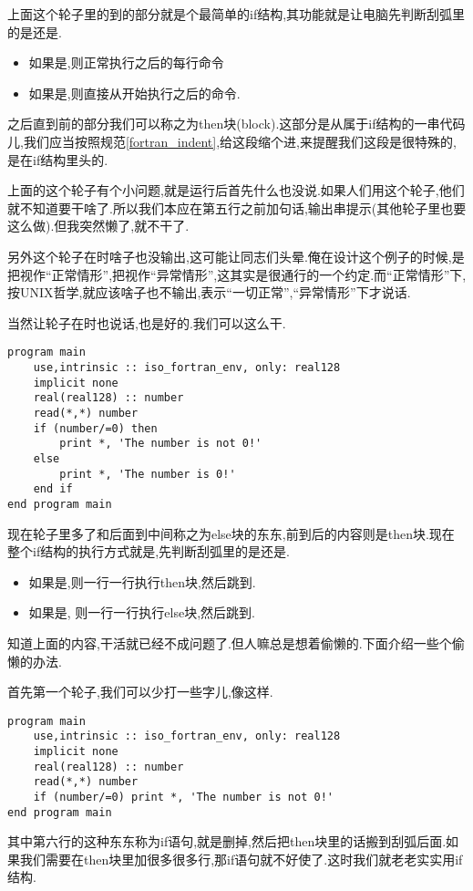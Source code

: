 上面这个轮子里的到的部分就是个最简单的if结构,其功能就是让电脑先判断刮弧里的是还是.
\begin{itemize}
    \item 如果是,则正常执行之后的每行命令
    \item 如果是,则直接从开始执行之后的命令.
\end{itemize}

之后直到前的部分我们可以称之为then块(block).这部分是从属于if结构的一串代码儿,我们应当按照规范\ref{fortran_indent},给这段缩个进,来提醒我们这段是很特殊的,是在if结构里头的.

上面的这个轮子有个小问题,就是运行后首先什么也没说.如果人们用这个轮子,他们就不知道要干啥了.所以我们本应在第五行之前加句话,输出串提示(其他轮子里也要这么做).但我突然懒了,就不干了.

另外这个轮子在时啥子也没输出,这可能让同志们头晕.俺在设计这个例子的时候,是把视作``正常情形'',把视作``异常情形'',这其实是很通行的一个约定.而``正常情形''下,按UNIX哲学,就应该啥子也不输出,表示``一切正常'',``异常情形''下才说话.

当然让轮子在时也说话,也是好的.我们可以这么干.\newpage
\begin{lstlisting}
program main
    use,intrinsic :: iso_fortran_env, only: real128
    implicit none
    real(real128) :: number
    read(*,*) number
    if (number/=0) then
        print *, 'The number is not 0!'
    else
        print *, 'The number is 0!'
    end if
end program main
\end{lstlisting}
现在轮子里多了和后面到中间称之为else块的东东,前到后的内容则是then块.现在整个if结构的执行方式就是,先判断刮弧里的是还是.
\begin{itemize}
    \item 如果是,则一行一行执行then块,然后跳到.
    \item 如果是, 则一行一行执行else块,然后跳到.
\end{itemize}

知道上面的内容,干活就已经不成问题了.但人嘛总是想着偷懒的.下面介绍一些个偷懒的办法.

首先第一个轮子,我们可以少打一些字儿,像这样.
\begin{lstlisting}
program main
    use,intrinsic :: iso_fortran_env, only: real128
    implicit none
    real(real128) :: number
    read(*,*) number
    if (number/=0) print *, 'The number is not 0!'
end program main
\end{lstlisting}
其中第六行的这种东东称为if语句,就是删掉,然后把then块里的话搬到刮弧后面.如果我们需要在then块里加很多很多行,那if语句就不好使了.这时我们就老老实实用if结构.

